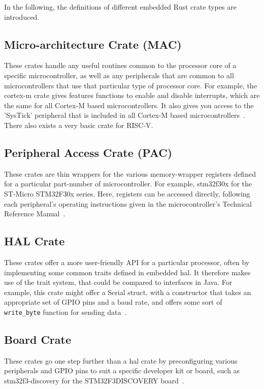 In the following, the definitions of different embedded Rust crate types are introduced.

\subsection{Micro-architecture Crate (MAC)}
These crates handle any useful routines common to the processor core of a specific microcontroller, as well as any peripherals that are common to all microcontrollers that use that particular type of processor core. For example, the cortex-m crate gives features functions to enable and disable interrupts, which are the same for all Cortex-M based microcontrollers. It also gives you access to the 'SysTick' peripheral that is included in all Cortex-M based microcontrollers~\cite{RustEmbedded}. There also exists a very basic crate for RISC-V.

\subsection{Peripheral Access Crate (PAC)}
These crates are thin wrappers for the various memory-wrapper registers defined for a particular part-number of microcontroller. For example, stm32f30x for the ST-Micro STM32F30x series. Here, registers can be accessed directly, following each peripheral's operating instructions given in the microcontroller's Technical Reference Manual~\cite{RustEmbedded}.

\subsection{HAL Crate}
These crates offer a more user-friendly API for a particular processor, often by implementing some common traits defined in embedded \gls{hal}. It therefore makes use of the trait system, that could be compared to interfaces in Java. For example, this crate might offer a Serial struct, with a constructor that takes an appropriate set of GPIO pins and a baud rate, and offers some sort of \texttt{write_byte} function for sending data~\cite{RustEmbedded}. 

\subsection{Board Crate}
These crates go one step further than a \gls{hal} crate by preconfiguring various peripherals and GPIO pins to suit a specific developer kit or board, such as stm32f3-discovery for the STM32F3DISCOVERY board~\cite{RustEmbedded}.

